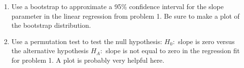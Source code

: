 \documentclass[12pt]{article}\usepackage[]{graphicx}\usepackage[]{color}
\begin{document}
\begin{enumerate}
   \item Use a bootstrap to approximate a 95\% confidence interval for the slope parameter in the linear regression from problem 1. Be sure to make a plot of the bootstrap distribution. 
    
    \item Use a permutation test to test the null hypothesis: $H_{0}:$ slope is zero versus the alternative hypothesis $H_{A}:$ slope is not equal to zero in the regression fit for problem 1. A plot is probably very helpful here. 
    
   
  \end{enumerate}
    
\end{document}
